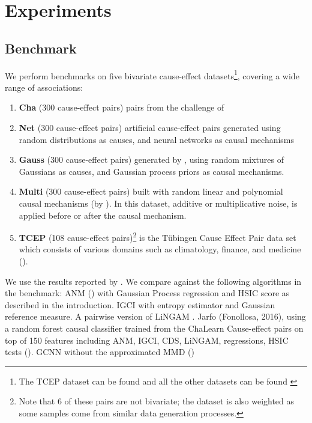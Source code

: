 \chapter{Experiments}


\section{Benchmark}

We perform benchmarks on five bivariate cause-effect datasets\footnote{ The TCEP dataset 
can be found \href{https://webdav.tuebingen.mpg.de/cause-effect/}{\color{blue}{here}} and 
all the other datasets can be found 
\href{https://dataverse.harvard.edu/dataset.xhtml?persistentId=doi:10.7910/DVN/3757KX}{\color{blue}{here}}
}, covering a wide range of associations:

\begin{enumerate}[noitemsep, topsep=0pt]

    \item \textbf{Cha} (300 cause-effect pairs) pairs from the challenge of \cite{chalearn}
    \item \textbf{Net} (300 cause-effect pairs) artificial cause-effect pairs generated using 
            random distributions as causes, and neural networks as causal mechanisms
    \item \textbf{Gauss} (300 cause-effect pairs) generated by \cite{Mooij2016jmlr}, using random 
      mixtures of Gaussians as causes, and Gaussian process priors as causal mechanisms.
    \item \textbf{Multi} (300 cause-effect pairs) built with random linear and 
    polynomial causal mechanisms (by \cite{goudet2017causal}). In this dataset, 
    additive or multiplicative noise, is applied before or after the causal mechanism.
    \item \textbf{TCEP} (108 cause-effect pairs)\footnote{Note that 6 of these pairs are not bivariate; the 
    dataset is also weighted as some samples come from similar data generation processes. } 
     is the Tübingen Cause Effect Pair data set which consists of various 
    domains such as climatology, finance, and medicine (\cite{Mooij2016jmlr}).

\end{enumerate}

We use the results reported by \cite{goudet2017causal}. We compare against the following algorithms
in the benchmark: ANM (\cite{Mooij2016jmlr}) with Gaussian Process regression and HSIC score as described 
in the introduction. IGCI \cite{daniusis2012inferring} with entropy estimator and Gaussian reference measure.
A  pairwise version of LiNGAM \cite{shimizu2011directlingam}.  Jarfo (Fonollosa, 2016), using a random forest 
causal classifier trained from the ChaLearn Cause-effect pairs on top of 150 features including ANM, IGCI,
CDS, LiNGAM, regressions, HSIC tests (\cite{fonollosa2019conditional}). GCNN without the approximated MMD (\cite{goudet2017causal})

